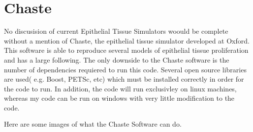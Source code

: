 \chapter{Chaste}
No discusision of current Epithelial Tissue Simulators woould be complete without a mention of Chaste, the epithelial tissue simulator developed at Oxford. This software is able to reproduce several models of epithelial tissue proliferation and has a large following. The only downside to the Chaste software is the number of dependencies requiered to run this code. Several open source libraries are used( e.g. Boost, PETSc, etc) which must be installed correctly in order for the code to run. In addition, the code will run exclusivley on linux machines, whereas my code can be run on windows with very little modification to the code. 

Here are some images of what the Chaste Software can do.